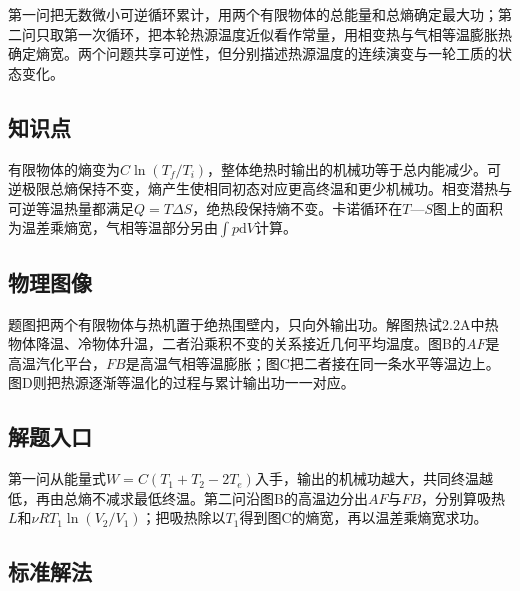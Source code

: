 \documentclass[UTF8,fontset=fandol,a4paper,11pt]{ctexart}
\begin{document}
第一问把无数微小可逆循环累计，用两个有限物体的总能量和总熵确定最大功；第二问只取第一次循环，把本轮热源温度近似看作常量，用相变热与气相等温膨胀热确定熵宽。两个问题共享可逆性，但分别描述热源温度的连续演变与一轮工质的状态变化。



\subsection*{知识点}

有限物体的熵变为$C\ln(T_f/T_i)$，整体绝热时输出的机械功等于总内能减少。可逆极限总熵保持不变，熵产生使相同初态对应更高终温和更少机械功。相变潜热与可逆等温热量都满足$Q=T\Delta S$，绝热段保持熵不变。卡诺循环在$T$—$S$图上的面积为温差乘熵宽，气相等温部分另由$\int p\mathrm dV$计算。



\subsection*{物理图像}

题图把两个有限物体与热机置于绝热围壁内，只向外输出功。解图热试2.2A中热物体降温、冷物体升温，二者沿乘积不变的关系接近几何平均温度。图B的$AF$是高温汽化平台，$FB$是高温气相等温膨胀；图C把二者接在同一条水平等温边上。图D则把热源逐渐等温化的过程与累计输出功一一对应。



\subsection*{解题入口}

第一问从能量式$W=C(T_1+T_2-2T_e)$入手，输出的机械功越大，共同终温越低，再由总熵不减求最低终温。第二问沿图B的高温边分出$AF$与$FB$，分别算吸热$L$和$\nu RT_1\ln(V_2/V_1)$；把吸热除以$T_1$得到图C的熵宽，再以温差乘熵宽求功。



\subsection*{标准解法}
\end{document}
